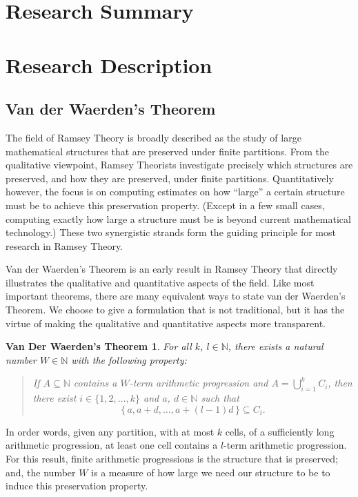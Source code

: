 \documentclass[12pt]{article}
\theoremstyle{plain}
\newtheorem*{vdw}{Van Der Waerden's Theorem}
\theoremstyle{definition}
\newcommand{\bbN}{\mathbb{N}}
\begin{document}
\section{Research Summary}

\section{Research Description}
\subsection{Van der Waerden's Theorem}
The field of Ramsey Theory is broadly described as the study of large
mathematical structures that are preserved under finite partitions.
From the qualitative viewpoint, Ramsey Theorists investigate precisely which
structures are preserved, and how they are preserved, under
finite partitions.
Quantitatively however, the focus is on computing estimates on how ``large'' a
certain structure must be to achieve this preservation property. 
(Except in a few small cases, computing exactly how large a structure
must be is beyond current mathematical technology.)
These two synergistic strands form the guiding principle for most research
in Ramsey Theory.

Van der Waerden's Theorem is an early result
\cite{Van-der-Waerden:1927fk} in Ramsey Theory that
directly illustrates the qualitative and quantitative aspects of the
field. 
Like most important theorems, there are many equivalent ways to state
van der Waerden's Theorem.
We choose to give a formulation that is not traditional, but it has
the virtue of making the qualitative and quantitative aspects more
transparent. 

  \begin{vdw}
    For all $k$, $l \in \bbN$, there exists a natural number $W \in
    \bbN$ with the following property: 
      \begin{quote}
        If $A \subseteq \bbN$ contains a $W$-term arithmetic
        progression and $A = \bigcup_{i=1}^k C_i$, then there exist $i
        \in \{1, 2, \ldots, k \}$ and $a$, $d \in \bbN$ such that 
          \[
            \{\, a, a + d, \ldots, a +(l-1)d \,\} \subseteq C_i.
          \]
      \end{quote}
  \end{vdw}

In order words, given any partition, with at most $k$ cells, of a
sufficiently long arithmetic progression, at least one cell contains a
$l$-term arithmetic progression.
For this result, finite arithmetic progressions is the structure
that is preserved; and, the number $W$ is a measure of how large we
need our structure to be to induce this preservation property.
\end{document}
